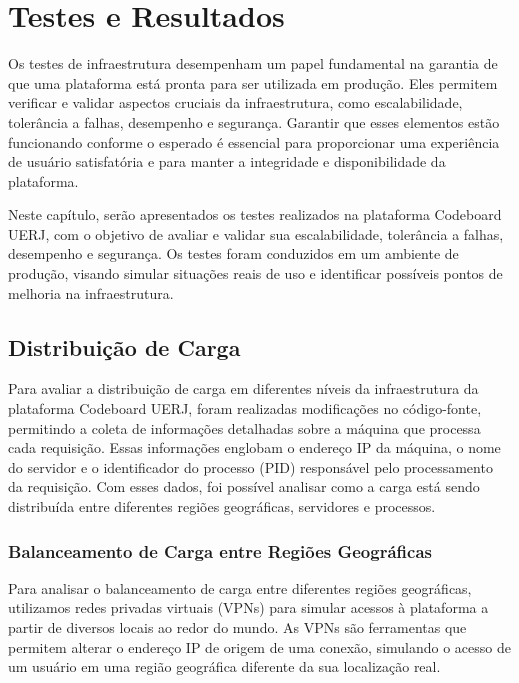 \chapter{Testes e Resultados}

Os testes de infraestrutura desempenham um papel fundamental na garantia de que uma plataforma está pronta para ser utilizada em produção. Eles permitem verificar e validar aspectos cruciais da infraestrutura, como escalabilidade, tolerância a falhas, desempenho e segurança. Garantir que esses elementos estão funcionando conforme o esperado é essencial para proporcionar uma experiência de usuário satisfatória e para manter a integridade e disponibilidade da plataforma.

Neste capítulo, serão apresentados os testes realizados na plataforma Codeboard UERJ, com o objetivo de avaliar e validar sua escalabilidade, tolerância a falhas, desempenho e segurança. Os testes foram conduzidos em um ambiente de produção, visando simular situações reais de uso e identificar possíveis pontos de melhoria na infraestrutura.


\section{Distribuição de Carga}

Para avaliar a distribuição de carga em diferentes níveis da infraestrutura da plataforma Codeboard UERJ, foram realizadas modificações no código-fonte, permitindo a coleta de informações detalhadas sobre a máquina que processa cada requisição. Essas informações englobam o endereço IP da máquina, o nome do servidor e o identificador do processo (PID) responsável pelo processamento da requisição. Com esses dados, foi possível analisar como a carga está sendo distribuída entre diferentes regiões geográficas, servidores e processos.

\subsection{Balanceamento de Carga entre Regiões Geográficas}

Para analisar o balanceamento de carga entre diferentes regiões geográficas, utilizamos redes privadas virtuais (VPNs) para simular acessos à plataforma a partir de diversos locais ao redor do mundo. As VPNs são ferramentas que permitem alterar o endereço IP de origem de uma conexão, simulando o acesso de um usuário em uma região geográfica diferente da sua localização real.

